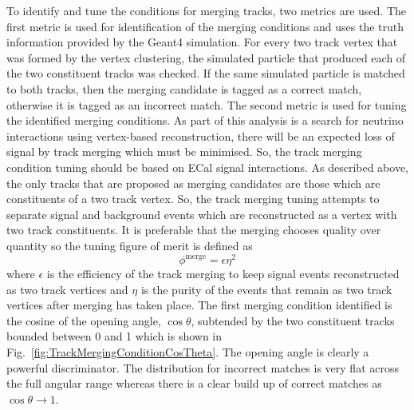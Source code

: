 To identify and tune the conditions for merging tracks, two metrics are used.  The first metric is used for identification of the merging conditions and uses the truth information provided by the Geant4 simulation.  For every two track vertex that was formed by the vertex clustering, the simulated particle that produced each of the two constituent tracks was checked.  If the same simulated particle is matched to both tracks, then the merging candidate is tagged as a correct match, otherwise it is tagged as an incorrect match.  The second metric is used for tuning the identified merging conditions.  As part of this analysis is a search for neutrino interactions using vertex-based reconstruction, there will be an expected loss of signal by track merging which must be minimised.  So, the track merging condition tuning should be based on ECal signal interactions.  As described above, the only tracks that are proposed as merging candidates are those which are constituents of a two track vertex.  So, the track merging tuning attempts to separate signal and background events which are reconstructed as a vertex with two track constituents.  It is preferable that the merging chooses quality over quantity so the tuning figure of merit is defined as 
\begin{equation}
  \phi^{\textrm{merge}} = \epsilon \eta^2
  \label{eqn:TrackMergingTuningMetric}
\end{equation}
where $\epsilon$ is the efficiency of the track merging to keep signal events reconstructed as two track vertices and $\eta$ is the purity of the events that remain as two track vertices after merging has taken place.
\newline
\newline
The first merging condition identified is the cosine of the opening angle, $\cos\theta$, subtended by the two constituent tracks bounded between 0 and 1 which is shown in Fig.~\ref{fig:TrackMergingConditionCosTheta}.  The opening angle is clearly a powerful discriminator.  The distribution for incorrect matches is very flat across the full angular range whereas there is a clear build up of correct matches as $\cos\theta \rightarrow 1$.
